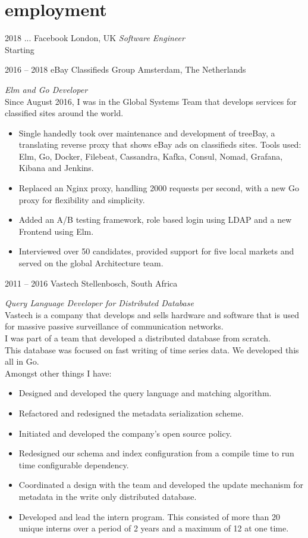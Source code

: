 \documentclass[print]{friggeri-cv-a4} %
\begin{document}
\section{employment}
\begin{entrylist}

\entry
{2018 ...}
{Facebook}
{London, UK}
{\emph{Software Engineer} \\
Starting
}

\entry
{2016 -- 2018}
{eBay Classifieds Group}
{Amsterdam, The Netherlands}
{\emph{Elm and Go Developer} \\
Since August 2016, I was in the Global Systems Team that develops services for classified sites around the world.
\begin{itemize}
\item Single handedly took over maintenance and development of treeBay, a translating reverse proxy that shows eBay ads on classifieds sites.
      Tools used: Elm, Go, Docker, Filebeat, Cassandra, Kafka, Consul, Nomad, Grafana, Kibana and Jenkins.
\item Replaced an Nginx proxy, handling 2000 requests per second, with a new Go proxy for flexibility and simplicity.
\item Added an A/B testing framework, role based login using LDAP and a new Frontend using Elm.
\item Interviewed over 50 candidates, provided support for five local markets and served on the global Architecture team.
\end{itemize}
}

\entry
{2011 -- 2016}
{Vastech}
{Stellenbosch, South Africa}
{\emph{Query Language Developer for Distributed Database} \\
Vastech is a company that develops and sells hardware and software that is used for massive passive surveillance of communication networks. \\
I was part of a team that developed a distributed database from scratch. \\
This database was focused on fast writing of time series data.  We developed this all in Go. \\
Amongst other things I have: \\
\begin{itemize}
\item Designed and developed the query language and matching algorithm.
\item Refactored and redesigned the metadata serialization scheme.
\item Initiated and developed the company's open source policy.
\item Redesigned our schema and index configuration from a compile time to run time configurable dependency.
\item Coordinated a design with the team and developed the update mechanism for metadata in the write only distributed database.
\item Developed and lead the intern program. This consisted of more than 20 unique interns over a period of 2 years and a maximum of 12 at one time.
\end{itemize}
}


\end{entrylist}
\end{document}
